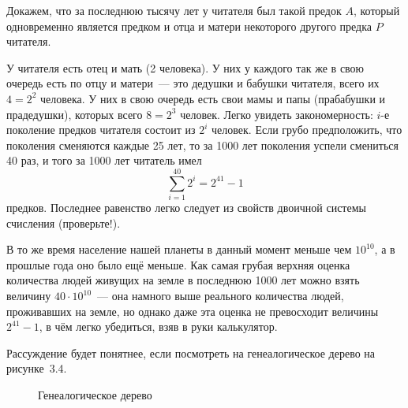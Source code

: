 \begin{example}
Докажем, что за последнюю тысячу лет у читателя был такой предок $A$, который одновременно является предком и отца и матери некоторого другого предка $P$ читателя.

У читателя есть отец и мать (2 человека). У них у каждого так же в свою очередь есть по отцу и матери~--- это дедушки и бабушки читателя, всего их $4=2^2$ человека. У них в свою очередь есть свои мамы и папы (прабабушки и прадедушки), которых всего $8=2^3$ человек. Легко увидеть закономерность: $i$-е поколение предков читателя состоит из $2^i$ человек. Если грубо предположить, что поколения сменяются каждые 25 лет, то за 1000 лет поколения успели смениться 40 раз, и того за 1000 лет читатель имел
$$\sum_{i=1}^{40} 2^i = 2^{41} - 1$$
предков. Последнее равенство легко следует из свойств двоичной системы счисления (проверьте!).

В то же время население нашей планеты в данный момент меньше чем $10^{10}$, а в прошлые года оно было ещё меньше. Как самая грубая верхняя оценка количества людей живущих на земле в последнюю 1000 лет можно взять величину $40\cdot 10^{10}$~--- она намного выше реального количества людей, проживавших на земле, но однако даже эта оценка не превосходит величины $2^{41} - 1$, в чём легко убедиться, взяв в руки калькулятор.

Рассуждение будет понятнее, если посмотреть на генеалогическое дерево на рисунке~3.4.

\begin{figure}[h]
\centering
{}
\caption{Генеалогическое дерево}
\end{figure}


\end{example}
